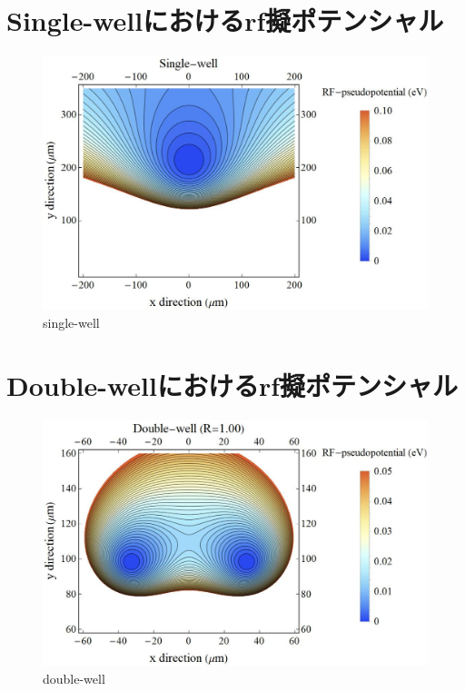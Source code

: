 \section{Single-wellにおけるrf擬ポテンシャル}
\begin{figure}[h]
	\includegraphics[width = 0.7\linewidth]{./simulation/figure/Single-well_Contour_xy@z=0.jpg}
	\caption{single-well}
	\label{fig:single-well_example}
\end{figure}
\section{Double-wellにおけるrf擬ポテンシャル}
\begin{figure}[h]
	\includegraphics[width = 0.7\linewidth]{./simulation/figure/Double-well_Contour_xy_R=100.jpg}
	\caption{double-well}
	\label{fig:double-well_example}
\end{figure}